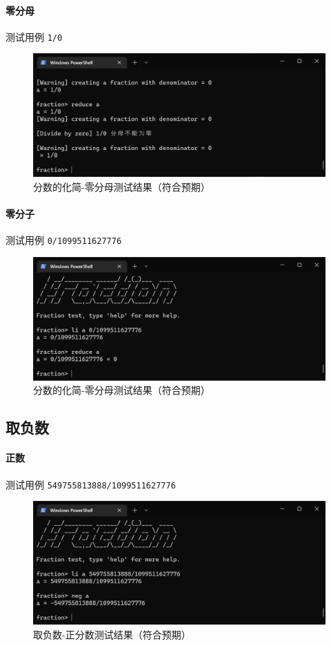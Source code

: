 \documentclass[cn,black,12pt,normal]{elegantnote}
\begin{document}
\paragraph{零分母} 测试用例 \lstinline{1/0}
\begin{figure}[H]
    \centering
    \includegraphics[width=.8\textwidth]{imgs/test_reduce_zero1.jpg}
    \caption{分数的化简-零分母测试结果（符合预期）}
\end{figure}

\paragraph{零分子} 测试用例 \lstinline{0/1099511627776}
\begin{figure}[H]
    \centering
    \includegraphics[width=.8\textwidth]{imgs/test_reduce_zero2.jpg}
    \caption{分数的化简-零分母测试结果（符合预期）}
\end{figure}

\subsection{取负数}

\paragraph{正数} 测试用例 \lstinline{549755813888/1099511627776}
\begin{figure}[H]
    \centering
    \includegraphics[width=.8\textwidth]{imgs/test_neg_positive_frac.jpg}
    \caption{取负数-正分数测试结果（符合预期）}
\end{figure}
\end{document}
